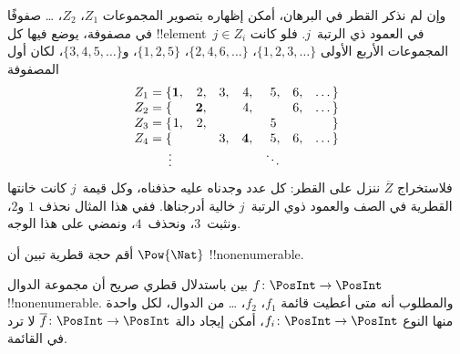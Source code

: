 \documentclass[../../../include/open-logic-section]{subfiles}
\begin{document}
\begin{explain}
وإن لم نذكر القطر في البرهان، أمكن إظهاره بتصوير المجموعات $Z_1$، $Z_2$، \dots{} صفوفًا في مصفوفة، يوضع فيها كل !!{element}~$j \in Z_i$ في العمود ذي الرتبة~$j$. فلو كانت المجموعات الأربع الأولى $\{1,2,3,\dots\}$، $\{2, 4, 6, \dots\}$، $\{1,2,5\}$، و$\{3,4,5,\dots\}$، لكان أول المصفوفة
\[
\begin{array}{r@{}rrrrrrr}
  Z_1 = \{ & \mathbf{1}, & 2, & 3, & 4, & 5, & 6, & \dots\}\\
  Z_2 = \{ &  & \mathbf{2}, &  & 4, &  & 6, & \dots\}\\
  Z_3 = \{ & 1, & 2, &  &  & 5\phantom{,} &  & \}\\
  Z_4 = \{ &  &  & 3, & \mathbf{4}, & 5, & 6, & \dots\}\\
  \vdots & & & & & \ddots
\end{array}
\]
فلاستخراج $\overline{Z}$ ننزل على القطر: كل عدد وجدناه عليه حذفناه، وكل قيمة~$j$ كانت خانتها القطرية في الصف والعمود ذوي الرتبة~$j$ خالية أدرجناها. ففي هذا المثال نحذف $1$ و$2$، ونثبت~$3$، ونحذف~$4$، ونمضي على هذا الوجه.
\end{explain}

\begin{prob}
أقم حجة قطرية تبين أن $\Pow{\Nat}$ !!{nonenumerable}.
\end{prob}

\begin{prob}\label{sfr:siz:nen:prob:f-posint}
بين باستدلال قطري صريح أن مجموعة الدوال $f \colon \PosInt \to \PosInt$ !!{nonenumerable}. والمطلوب أنه متى أعطيت قائمة $f_1$، $f_2$، \dots{} من الدوال، لكل واحدة منها النوع $f_i\colon
\PosInt \to \PosInt$، أمكن إيجاد دالة $\overline{f}\colon \PosInt \to
\PosInt$ لا ترد في القائمة.
\end{prob}
\end{document}
